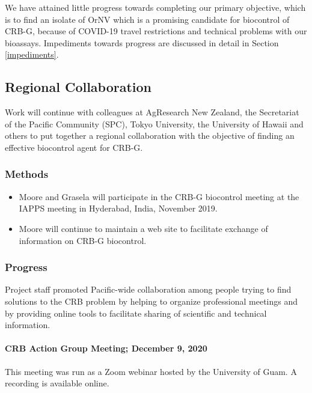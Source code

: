 \documentclass[12pt,letterpaper,english,bibliography=totocnumbered,abstract=on]{scrartcl}
\begin{document}
We have attained little progress towards completing our primary objective, which is to find an isolate of OrNV which is a promising candidate for biocontrol of CRB-G, because of COVID-19 travel restrictions and technical problems with our bioassays. Impediments towards progress are discussed in detail in Section \ref{impediments}.

\newpage
\begin{framed}
\subsection{Regional Collaboration}

Work will continue with colleagues at AgResearch New Zealand, the Secretariat of the Pacific Community (SPC), Tokyo University, the University of Hawaii and others to put together a regional collaboration with the objective of finding an effective biocontrol agent for CRB-G.

\subsubsection{Methods}

\begin{itemize}
    \item Moore and Grasela will participate in the CRB-G biocontrol meeting at the IAPPS meeting in Hyderabad, India, November 2019.
    \item Moore will continue to maintain a web site to facilitate exchange of information on CRB-G biocontrol.
\end{itemize}
\end{framed}

\subsubsection{Progress}

Project staff promoted Pacific-wide collaboration among people trying to find solutions to the CRB problem by helping to organize professional meetings and by providing online tools to facilitate sharing of scientific and technical information.

\paragraph{CRB Action Group Meeting; December 9, 2020}
This meeting was run as a Zoom webinar hosted by the University of Guam. A recording is available online.\cite{mooreVideoRecordingCRBG2021}
\end{document}

